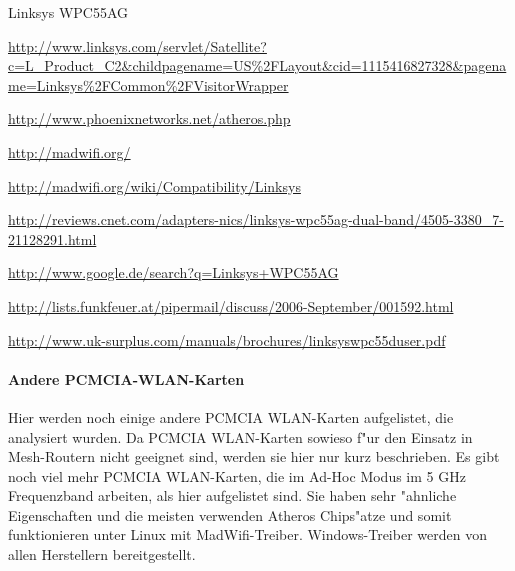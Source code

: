 \begin{wlandevice}{Linksys WPC55AG}
\begin{wlanlink}
\item \url{http://www.linksys.com/servlet/Satellite?c=L_Product_C2&childpagename=US\%2FLayout&cid=1115416827328&pagename=Linksys\%2FCommon\%2FVisitorWrapper}
\item \url{http://www.phoenixnetworks.net/atheros.php}
\item \url{http://madwifi.org/}
\item \url{http://madwifi.org/wiki/Compatibility/Linksys}
\item \url{http://reviews.cnet.com/adapters-nics/linksys-wpc55ag-dual-band/4505-3380_7-21128291.html}
\item \url{http://www.google.de/search?q=Linksys+WPC55AG}
\item \url{http://lists.funkfeuer.at/pipermail/discuss/2006-September/001592.html}
\item \url{http://www.uk-surplus.com/manuals/brochures/linksyswpc55duser.pdf}
\end{wlanlink}

\end{wlandevice}

\paragraph{Andere PCMCIA-WLAN-Karten}\mbox{}

Hier werden noch einige andere PCMCIA WLAN-Karten aufgelistet, die
analysiert wurden. Da PCMCIA WLAN-Karten sowieso f"ur den Einsatz in
Mesh-Routern nicht geeignet sind, werden sie hier nur kurz beschrieben.
Es gibt noch viel mehr PCMCIA WLAN-Karten, die im Ad-Hoc Modus im 5 GHz
Frequenzband arbeiten, als hier aufgelistet sind. Sie haben sehr
"ahnliche Eigenschaften und die meisten verwenden Atheros Chips"atze
und somit funktionieren unter Linux mit MadWifi-Treiber. Windows-Treiber
werden von allen Herstellern bereitgestellt.

